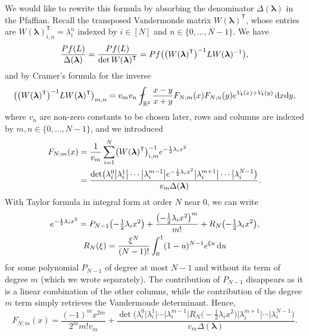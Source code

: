 \documentclass[11pt]{article}
\numberwithin{equation}{section}
\numberwithin{equation}{section}
\newcommand{\dd}{\mathrm{d}}
\begin{document}
We would like to rewrite this formula by absorbing the denominator $\Delta(\boldsymbol{\lambda})$ in the Pfaffian. Recall the transposed Vandermonde matrix $W(\boldsymbol{\lambda})^{\mathsf T}$, whose entries are $W(\boldsymbol{\lambda})_{i,n}^{\mathsf T} = \lambda_i^{n}$ indexed by $i \in [N]$ and $n \in \{0,\dots,N - 1\}$. We have
\[
\frac{{\rm Pf}(L)}{\Delta(\boldsymbol{\lambda})} = \frac{{\rm Pf}(L)}{\det W(\boldsymbol{\lambda})^{\mathsf T}} = {\rm Pf}\bigl(\bigl(W(\boldsymbol{\lambda})^{\mathsf T}\bigr)^{-1} LW(\boldsymbol{\lambda})^{-1}\bigr),
\]
and by Cramer's formula for the inverse
\[
\bigl(\bigl(W(\boldsymbol{\lambda})^{\mathsf T}\bigr)^{-1} L W(\boldsymbol{\lambda})^{\mathsf T}\bigr)_{m,n} = v_mv_n\fint_{\mathbb{R}^2} \frac{x - y}{x + y} F_{N;m}(x)F_{N;n}(y) {\rm e}^{V_{\mathbf{t}}(x) + V_{\mathbf{t}}(y)}\,\dd x\dd y,
\]
where $v_n$ are non-zero constants to be chosen later, rows and columns are indexed by $m,n \in \{0,\dots,N - 1\}$, and we introduced
\begin{align*}
F_{N;m}(x) &{}= \frac{1}{v_m}\sum_{i = 1}^{N} \bigl(W(\boldsymbol{\lambda})^{\mathsf T}\bigr)^{-1}_{i,m} {\rm e}^{-\frac{1}{2}\lambda_i x^2} \\
&{}= \frac{\det\bigl(\lambda_i^0 \big| \lambda_i^1  \big| \cdots \big| \lambda_i^{m - 1} \big| {\rm e}^{-\frac{1}{2}\lambda_i x^2} \big| \lambda_i^{m + 1} \big| \cdots \big| \lambda_i^{N - 1}\bigr)}{v_m \Delta(\boldsymbol{\lambda})}.
\end{align*}
With Taylor formula in integral form at order $N$ near $0$, we can write
\begin{gather*}
{\rm e}^{-\frac{1}{2}\lambda_ix^2} = P_{N - 1}\bigl(-\tfrac{1}{2}\lambda_ix^2\bigr) + \frac{\bigl(-\frac{1}{2}\lambda_i x^2\bigr)^m}{m!} + R_{N}\bigl(-\tfrac{1}{2}\lambda_i x^2\bigr), \\
R_N(\xi) = \frac{\xi^{N}}{(N - 1)!} \int_{0}^{1}(1-u)^{N - 1} {\rm e}^{\xi u}\, \dd u
\end{gather*}
for some polynomial $P_{N - 1}$ of degree at most $N - 1$ and without its term of degree $m$ (which we wrote separately). The contribution of $P_{N - 1}$ disappears as it is a linear combination of the other columns, while the contribution of the degree $m$ term simply retrieves the Vandermonde determinant. Hence,
\[
F_{N;m}(x) = \frac{(-1)^mx^{2m}}{2^m m! v_m} + \frac{\det\bigl(\lambda_i^0  \big| \lambda_i^1  \big| \cdots \big| \lambda_i^{m - 1} \big| R_N\bigl(-\tfrac{1}{2}\lambda_ix^2\bigr) \big| \lambda_i^{m + 1} \big| \cdots \big| \lambda_i^{N - 1}\bigr)}{v_m \Delta(\boldsymbol{\lambda})}.
\]
\end{document}
